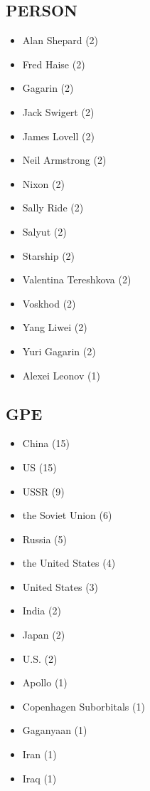 \documentclass[12pt]{article}
\begin{document}
\subsection*{PERSON}
\begin{itemize}
\item Alan Shepard (2)
\item Fred Haise (2)
\item Gagarin (2)
\item Jack Swigert (2)
\item James Lovell (2)
\item Neil Armstrong (2)
\item Nixon (2)
\item Sally Ride (2)
\item Salyut (2)
\item Starship (2)
\item Valentina Tereshkova (2)
\item Voskhod (2)
\item Yang Liwei (2)
\item Yuri Gagarin (2)
\item Alexei Leonov (1)
\end{itemize}

\subsection*{GPE}
\begin{itemize}
\item China (15)
\item US (15)
\item USSR (9)
\item the Soviet Union (6)
\item Russia (5)
\item the United States (4)
\item United States (3)
\item India (2)
\item Japan (2)
\item U.S. (2)
\item Apollo (1)
\item Copenhagen Suborbitals (1)
\item Gaganyaan (1)
\item Iran (1)
\item Iraq (1)
\end{itemize}
\end{document}
